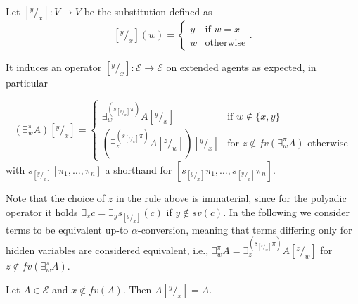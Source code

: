 \documentclass{llncs}
\newcommand{\tell}{{\bf tell}}
\newcommand{\ask}{{\bf ask}}
\newcommand{\ostop}{{\bf stop}}
\newcommand{\rarrow}{\rightarrow}
\begin{document}
\begin{definition}[Substitutions]
Let $[^y/_x]: V \to V$ be the substitution defined as
\[ [^y/_x](w) = 
		\begin{cases} 
			y & \text{if $w = x$} \\
            w & \text{otherwise}
        \end{cases}. \]

It induces an operator $[^y/_x]: \mathcal{E} \rarrow \mathcal{E}$ on extended agents as expected,  in particular

        $$(\exists^{\pi}_w A)[^y/_x] = \begin{cases} 
			\exists^{(s_{[^y/_x]} \pi)}_w A[^y/_x]  & \text{if } w \not \in \{x, y\} \\
             (\exists^{(s_{[^z/_w]} \pi)}_z A[^z/_w])[^y/_x] & \text{for } z \not \in fv(\exists^{\pi}_w A) \text{ otherwise}
        \end{cases}$$
with $s_{[^y/_x]} [ \pi_1, \ldots, \pi_n ]$ a shorthand for $[s_{[^y/_x]} \pi_1, \ldots, s_{[^y/_x]} \pi_n]$.
\end{definition}

Note that the choice of $z$ in the rule above is immaterial, since for the polyadic operator it holds
$\exists_x c = \exists_y s_{[^y/_x]}(c)$ if $y \not \in sv(c)$.
%
In the following we consider terms to be equivalent up-to $\alpha$-conversion, meaning that terms 
differing only for hidden variables are considered equivalent, i.e.,
$\exists_w^\pi A = \exists_z^{(s_{[^z/_w]}\pi)} A[^z/_w]$ for $z \not \in fv(\exists^{\pi}_w A)$.

\begin{lemma}
Let $A \in \mathcal{E}$ and $x \not \in fv(A)$. Then $A[^y/_x] = A$.
\end{lemma}
\end{document}
